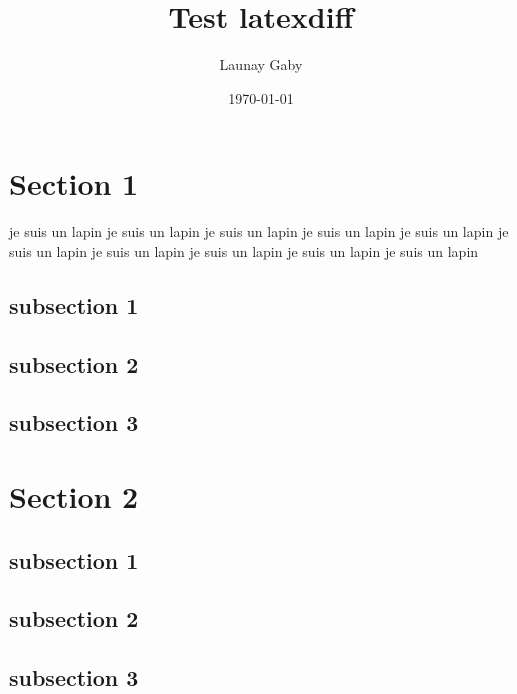 \documentclass[11pt, a4paper]{article}
\author{Launay Gaby}
\title{Test latexdiff}
\date{\today}
\begin{document}
\maketitle



\section{Section 1}
je suis un lapin
je suis un lapin
je suis un lapin
je suis un lapin
je suis un lapin
je suis un lapin
je suis un lapin
je suis un lapin
je suis un lapin
je suis un lapin
\subsection{subsection 1}
\subsection{subsection 2}
\subsection{subsection 3}

\section{Section 2}
\subsection{subsection 1}
\subsection{subsection 2}
\subsection{subsection 3}
\end{document}
